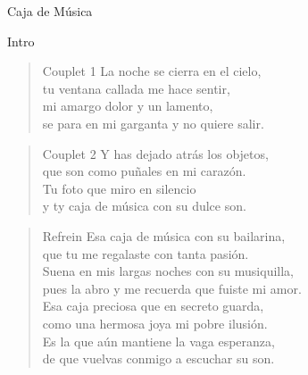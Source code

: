 \begin{song}[vals]{Caja de M\'usica}

\begin{instrumental}{Intro}
       
       
\end{instrumental}

\begin{verse}{Couplet 1}
    La noche se cierra en el cielo,\\
    tu ventana callada me hace sentir,\\
    mi amargo dolor y un lamento,\\
    se para en mi garganta y no quiere salir.
\end{verse}

\begin{verse}{Couplet 2}
    Y has dejado atr\'as los objetos,\\
    que son como pu\~nales en mi caraz\'on.\\
    Tu foto que miro en silencio\\
    y ty caja de m\'usica con su dulce son.
\end{verse}

\begin{verse}{Refrein}
    Esa caja de m\'usica con su bailarina,\\
    que tu me regalaste con tanta pasi\'on.\\
    Suena en mis largas noches con su musiquilla,\\
    pues la abro y me recuerda que fuiste mi amor.\\
    Esa caja preciosa que en secreto guarda,\\
    como una hermosa joya mi pobre ilusi\'on.\\
    Es la que a\'un mantiene la vaga esperanza,\\
    de que vuelvas conmigo a escuchar su son.
\end{verse}


\end{song}
